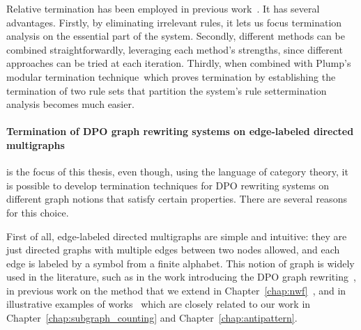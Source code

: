 

Relative termination has been employed in previous work~\cite{zantema2014termination,bruggink2014termination,bruggink2015proving,endrullis2024generalized_icgt}. It has several advantages.
  Firstly, by eliminating irrelevant rules, it lets us focus termination analysis on the essential part of the system.
  Secondly, different methods can be combined straightforwardly, leveraging each method's strengths, since different approaches can be tried at each iteration.
   Thirdly, when combined with Plump's modular termination technique~\cite{plump2018modular}\textemdash which proves termination by establishing the termination of two rule sets that partition the system's rule set\textemdash termination analysis becomes much easier.

\paragraph{Termination of DPO graph rewriting systems on edge-labeled directed multigraphs} is the focus of this thesis, even though, using the language of category theory, it is possible to develop termination techniques for DPO rewriting systems on different graph notions that satisfy certain properties. There are several reasons for this choice.

First of all, edge-labeled directed multigraphs are simple and intuitive: they are just directed graphs with multiple edges between two nodes allowed, and each edge is labeled by a symbol from a finite alphabet. This notion of graph is widely used in the literature, such as in the work introducing the DPO graph rewriting~\cite{ehrig1973graph}, in previous work on the method that we extend in Chapter~\ref{chap:nwf}~\cite{bruggink2014termination,bruggink2015proving,zantema2014termination}, and in illustrative examples of works~\cite{overbeek2024termination_lmcs,endrullis2024generalized_icgt} which are closely related to our work in Chapter~\ref{chap:subgraph_counting} and Chapter~\ref{chap:antipattern}.

